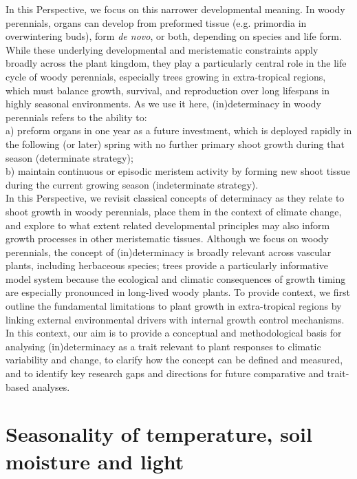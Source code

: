 \documentclass{article}
\begin{document}
		In this Perspective, we focus on this narrower developmental meaning. In woody perennials, organs can develop from preformed tissue (e.g. primordia in overwintering buds), form \textit{de novo}, or both, depending on species and life form. While these underlying developmental and meristematic constraints apply broadly across the plant kingdom, they play a particularly central role in the life cycle of woody perennials, especially trees growing in extra-tropical regions, which must balance growth, survival, and reproduction over long lifespans in highly seasonal environments. As we use it here, (in)determinacy in woody perennials refers to the ability to:\\
		
		a) preform organs in one year as a future investment, which is deployed rapidly in the following (or later) spring with no further primary shoot growth during that season (determinate strategy);\\
		b) maintain continuous or episodic meristem activity by forming new shoot tissue during the current growing season (indeterminate strategy).\\
		
In this Perspective, we revisit classical concepts of determinacy as they relate to shoot growth in woody perennials, place them in the context of climate change, and explore to what extent related developmental principles may also inform growth processes in other meristematic tissues. Although we focus on woody perennials, the concept of (in)determinacy is broadly relevant across vascular plants, including herbaceous species; trees provide a particularly informative model system because the ecological and climatic consequences of growth timing are especially pronounced in long-lived woody plants. To provide context, we first outline the fundamental limitations to plant growth in extra-tropical regions by linking external environmental drivers with internal growth control mechanisms. In this context, our aim is to provide a conceptual and methodological basis for analysing (in)determinacy as a trait relevant to plant responses to climatic variability and change, to clarify how the concept can be defined and measured, and to identify key research gaps and directions for future comparative and trait-based analyses.\\	
	
	\section*{Seasonality of temperature, soil moisture and light} %
		
\end{document}
